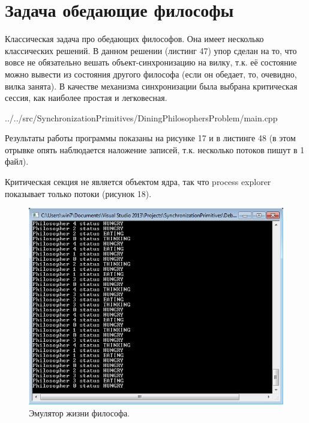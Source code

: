 \documentclass[a4paper, 12pt]{article}		%
\begin{document}
\section{Задача обедающие философы}

Классическая задача про обедающих философов\cite{Tanenbaum}. Она имеет несколько классических решений. В данном решении (листинг 47) упор сделан на то, что вовсе не обязательно вешать объект-синхронизацию на вилку, т.к. её состояние можно вывести из состояния другого философа (если он обедает, то, очевидно, вилка занята). В качестве механизма синхронизации была выбрана критическая сессия, как наиболее простая и легковесная.


{../../src/SynchronizationPrimitives/DiningPhilosophersProblem/main.cpp}

Результаты работы программы показаны на рисунке 17 и в листинге 48 (в этом отрывке опять наблюдается наложение записей, т.к. несколько потоков пишут в 1 файл).

Критическая секция не является объектом ядра, так что process explorer показывает только потоки (рисунок 18).
\newpage

\begin{figure}[h!]
\centering
\includegraphics[scale=1]{res/010}
\caption{Эмулятор жизни философа.}
\end{figure}


\end{document}
